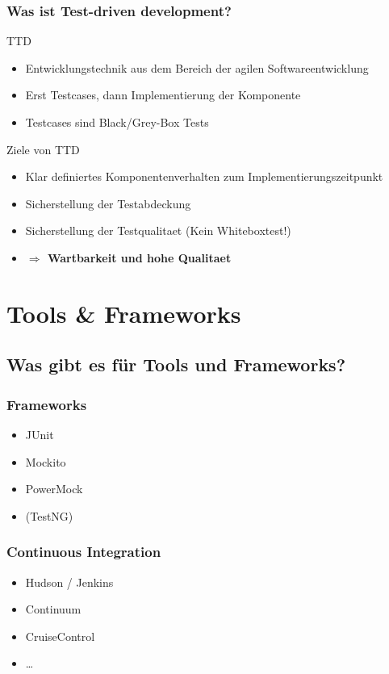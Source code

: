 \documentclass{beamer}
\begin{document}
			\begin{frame}
				\frametitle{Was ist Test-driven development?}
				TTD
				\begin{itemize}
					\item{Entwicklungstechnik aus dem Bereich der agilen Softwareentwicklung}
					\item{Erst Testcases, dann Implementierung der Komponente}
					\item{Testcases sind Black/Grey-Box Tests}
				\end{itemize}
				\pause
				Ziele von TTD
				\begin{itemize}
					\item{Klar definiertes Komponentenverhalten zum Implementierungszeitpunkt}
					\item{Sicherstellung der Testabdeckung} %
					\item{Sicherstellung der Testqualitaet (Kein Whiteboxtest!)} %
					\item{\color{red}\textbf{$\Rightarrow$ Wartbarkeit und hohe Qualitaet}} %
				\end{itemize}
			\end{frame}

	
	\section{Tools \& Frameworks}

		\subsection{Was gibt es für Tools und Frameworks?}

			\begin{frame}
				\frametitle{Frameworks}

				\begin{itemize}
					\item{JUnit}
					\item{Mockito}
					\item{PowerMock}
					\item{(TestNG)}
				\end{itemize}
			\end{frame}

			\begin{frame}
				\frametitle{Continuous Integration}

				\begin{itemize}
					\item{Hudson / Jenkins}
					\item{Continuum}
					\item{CruiseControl}
					\item{\ldots}
				\end{itemize}
			\end{frame}
\end{document}
